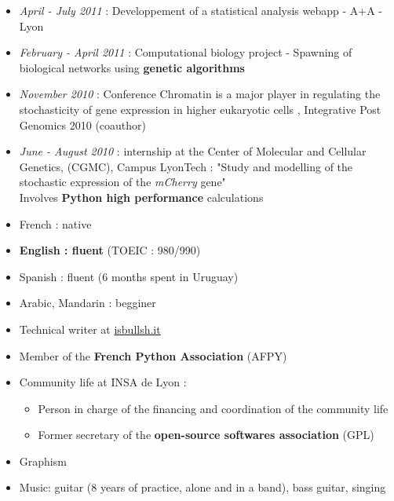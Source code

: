 \begin{itemize}
\renewcommand{\labelitemi}{$\circ$}
	\item \emph{April - July 2011} : Developpement of a statistical analysis webapp - A+A - Lyon
	\item \textit{February - April 2011} : Computational biology project - Spawning of biological networks using \textbf{genetic algorithms}
    \item \textit{November 2010} : Conference \og Chromatin is a major player in regulating the stochasticity of gene expression in higher eukaryotic cells \fg{}, Integrative Post Genomics 2010 (coauthor)
    \item \textit{June - August 2010} : internship at the Center of Molecular and Cellular Genetics, (CGMC), Campus LyonTech : "Study and modelling of the stochastic expression of the \textit{mCherry} gene" \\Involves \textbf{Python high performance} calculations
\end{itemize}


    \begin{itemize}
    \renewcommand{\labelitemi}{$\circ$}
    \item French : native
    \item \textbf{English : fluent} (TOEIC : 980/990)
    \item Spanish : fluent (6 months spent in Uruguay) 
    \item Arabic, Mandarin : begginer
\end{itemize}
    
\begin{itemize}
\renewcommand{\labelitemi}{$\circ$}
	\item Technical writer at \href{http://isbullsh.it}{isbullsh.it}
	\item Member of the \textbf{French Python Association} (AFPY) 
	\item Community life at INSA de Lyon :
	\begin{itemize}
		\item Person in charge of the financing and coordination of the community life
		\item Former secretary of the \textbf{open-source softwares association} (GPL) 
	\end{itemize}
    \item Graphism
    \item Music: guitar (8 years of practice, alone and in a band), bass guitar, singing    
\end{itemize}




